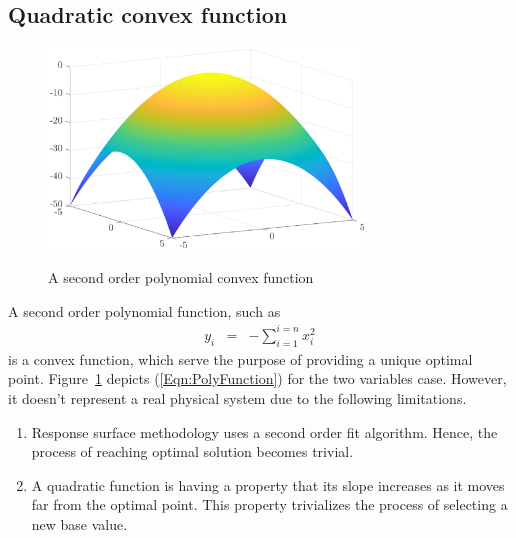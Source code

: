\documentclass[letterpaper, 12pt]{article}
\begin{document}
\subsection{Quadratic convex function}
\begin{figure}
	\centering
	\includegraphics[width=0.75\textwidth]{Matlab/poly-2-var}
	\label{Fig:TwoVariablePolynomial}
	\caption{A second order polynomial convex function}
\end{figure}
A second order polynomial function, such as
\begin{eqnarray}
y_i &=& -\sum_{i=1}^{i=n}{x_i^2} \label{Eqn:PolyFunction}
\end{eqnarray}
is a convex function, which serve the purpose of providing a unique optimal point. Figure~\ref{Fig:TwoVariablePolynomial} depicts (\ref{Eqn:PolyFunction}) for the two variables case. However, it doesn't represent a real physical system due to the following limitations.
\begin{enumerate}
	\item Response surface methodology uses a second order fit algorithm. Hence, the process of reaching optimal solution becomes trivial.
	\item A quadratic function is having a property that its slope increases as it moves far from the optimal point. This property trivializes the process of selecting a new base value.
\end{enumerate}
\end{document}
